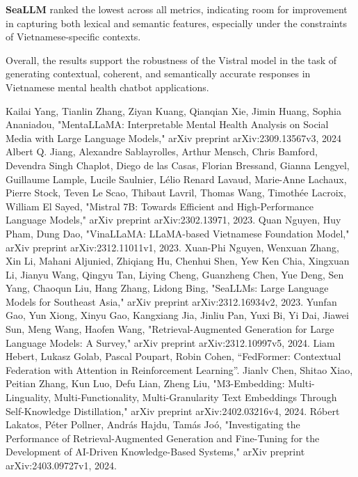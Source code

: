 \documentclass[conference]{IEEEtran}
\begin{document}
\textbf{SeaLLM} ranked the lowest across all metrics, indicating room for improvement in capturing both lexical and semantic features, especially under the constraints of Vietnamese-specific contexts.

Overall, the results support the robustness of the Vistral model in the task of generating contextual, coherent, and semantically accurate responses in Vietnamese mental health chatbot applications.



\begin{thebibliography}{9}
     Kailai Yang, Tianlin Zhang, Ziyan Kuang, Qianqian Xie, Jimin Huang, Sophia Ananiadou, "MentaLLaMA: Interpretable Mental Health Analysis on Social Media with Large Language Models," arXiv preprint arXiv:2309.13567v3, 2024
     Albert Q. Jiang, Alexandre Sablayrolles, Arthur Mensch, Chris Bamford, Devendra Singh Chaplot, Diego de las Casas, Florian Bressand, Gianna Lengyel, Guillaume Lample, Lucile Saulnier, Lélio Renard Lavaud, Marie-Anne Lachaux, Pierre Stock, Teven Le Scao, Thibaut Lavril, Thomas Wang, Timothée Lacroix, William El Sayed, "Mistral 7B: Towards Efficient and High-Performance Language Models," arXiv preprint arXiv:2302.13971, 2023.
     Quan Nguyen, Huy Pham, Dung Dao, "VinaLLaMA: LLaMA-based Vietnamese Foundation Model," arXiv preprint arXiv:2312.11011v1, 2023.
     Xuan-Phi Nguyen, Wenxuan Zhang, Xin Li, Mahani Aljunied, Zhiqiang Hu, Chenhui Shen, Yew Ken Chia, Xingxuan Li, Jianyu Wang, Qingyu Tan, Liying Cheng, Guanzheng Chen, Yue Deng, Sen Yang, Chaoqun Liu, Hang Zhang, Lidong Bing, "SeaLLMs: Large Language Models for Southeast Asia," arXiv preprint arXiv:2312.16934v2, 2023.
     Yunfan Gao, Yun Xiong, Xinyu Gao, Kangxiang Jia, Jinliu Pan, Yuxi Bi, Yi Dai, Jiawei Sun, Meng Wang, Haofen Wang, "Retrieval-Augmented Generation for Large Language Models: A Survey," arXiv preprint arXiv:2312.10997v5, 2024.
     Liam Hebert, Lukasz Golab, Pascal Poupart, Robin Cohen, ``FedFormer: Contextual Federation with Attention in Reinforcement Learning''.
     Jianlv Chen, Shitao Xiao, Peitian Zhang, Kun Luo, Defu Lian, Zheng Liu, "M3-Embedding: Multi-Linguality, Multi-Functionality, Multi-Granularity Text Embeddings Through Self-Knowledge Distillation," arXiv preprint arXiv:2402.03216v4, 2024.
     Róbert Lakatos, Péter Pollner, András Hajdu, Tamás Joó, "Investigating the Performance of Retrieval-Augmented Generation and Fine-Tuning for the Development of AI-Driven Knowledge-Based Systems," arXiv preprint arXiv:2403.09727v1, 2024.

\end{thebibliography}
\end{document}
